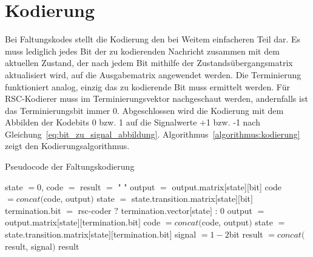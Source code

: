\section{Kodierung}
\label{kapitel:implementierung_kodierung}
Bei Faltungskodes stellt die Kodierung den bei Weitem einfacheren Teil dar. Es muss lediglich jedes Bit der zu kodierenden Nachricht zusammen mit dem aktuellen Zustand, der nach jedem Bit mithilfe der Zustandsübergangsmatrix aktualisiert wird, auf die Ausgabematrix angewendet werden. Die Terminierung funktioniert analog, einzig das zu kodierende Bit muss ermittelt werden. Für RSC-Kodierer muss im Terminierungsvektor nachgeschaut werden, andernfalls ist das Terminierungsbit immer 0. Abgeschlossen wird die Kodierung mit dem Abbilden der Kodebits 0 bzw. 1 auf die Signalwerte +1 bzw. -1 nach Gleichung~\eqref{eq:bit_zu_signal_abbildung}. Algorithmus~\ref{algorithmus:kodierung} zeigt den Kodierungsalgorithmus.
\begin{algorithm}[H]
\renewcommand{\algorithmicforall}{\textbf{for each}}
\caption{Pseudocode der Faltungskodierung}
\label{algorithmus:kodierung}
\begin{algorithmic}[1]
\STATE state $=0$, code $=$ result $=$ " "
   \STATE output $=$ output.matrix[state][bit]
	\STATE code $=\mathit{concat}($code, output$)$
	\STATE state $=$ state.transition.matrix$[$state$][$bit$]$
\ENDFOR
{}
      \STATE termination.bit $=$ rsc-coder $?$ termination.vector$[$state$]$ : $0$
      \STATE output $=$ output.matrix$[$state$][$termination.bit$]$
	   \STATE code $=\mathit{concat}($code, output$)$
	   \STATE state $=$ state.transition.matrix$[$state$][$termination.bit$]$
   \ENDFOR
\ENDIF
{}
   \STATE signal $=1-2$bit
   \STATE result $=\mathit{concat}($result, signal$)$
\ENDFOR
\RETURN result
\end{algorithmic}
\end{algorithm}

